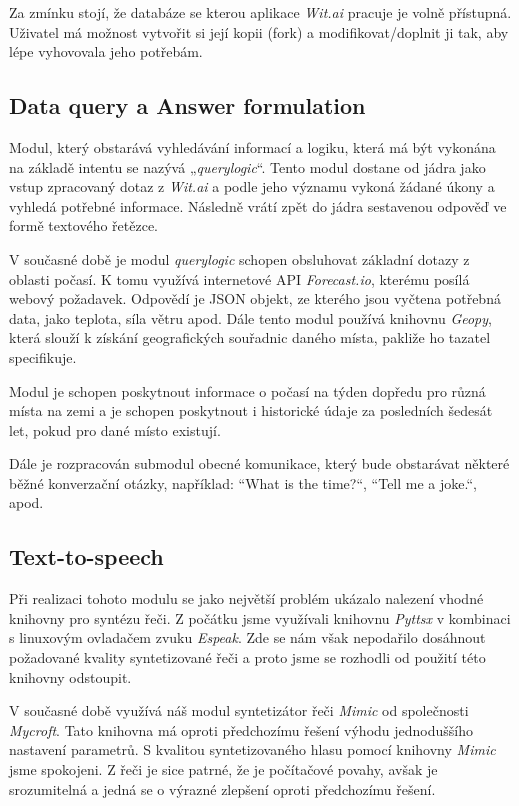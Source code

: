 \documentclass[12pt,a4paper]{article}
\begin{document}
Za zmínku stojí, že databáze se kterou aplikace \textit{Wit.ai} pracuje je volně přístupná. Uživatel má možnost vytvořit si její kopii (fork) a modifikovat/doplnit ji tak, aby lépe vyhovovala jeho potřebám.

\subsection{Data query a Answer formulation}
Modul, který obstarává vyhledávání informací a logiku, která má být vykonána na základě intentu se nazývá „\textit{querylogic}“. Tento modul dostane od jádra jako vstup zpracovaný dotaz z \textit{Wit.ai} a podle jeho významu vykoná žádané úkony a vyhledá potřebné informace. Následně vrátí zpět do jádra sestavenou odpověď ve formě textového řetězce.

V současné době je modul \textit{querylogic} schopen obsluhovat základní dotazy z oblasti počasí. K tomu využívá internetové API \textit{Forecast.io}, kterému posílá webový požadavek. Odpovědí je JSON objekt, ze kterého jsou vyčtena potřebná data, jako teplota, síla větru apod.
Dále tento modul používá knihovnu \textit{Geopy}, která slouží k získání geografických souřadnic daného místa, pakliže ho tazatel specifikuje. 

Modul je schopen poskytnout informace o počasí na týden dopředu pro různá místa na zemi a je schopen poskytnout i historické údaje za posledních šedesát let, pokud pro dané místo existují.

Dále je rozpracován submodul obecné komunikace, který bude obstarávat některé běžné konverzační otázky, například:  “What is the time?“, “Tell me a joke.“, apod.

\subsection{Text-to-speech}
Při realizaci tohoto modulu se jako největší problém ukázalo nalezení vhodné knihovny pro syntézu řeči. Z počátku jsme využívali knihovnu \textit{Pyttsx} v kombinaci s linuxovým ovladačem zvuku \textit{Espeak}. Zde se nám však nepodařilo dosáhnout požadované kvality syntetizované řeči a proto jsme se rozhodli od použití této knihovny odstoupit.

V současné době využívá náš modul syntetizátor řeči \textit{Mimic} od společnosti \textit{Mycroft}. 
Tato knihovna má oproti předchozímu řešení výhodu jednoduššího nastavení parametrů. S kvalitou syntetizovaného hlasu pomocí knihovny \textit{Mimic} jsme spokojeni. Z řeči je sice patrné, že je počítačové povahy, avšak je srozumitelná a jedná se o výrazné zlepšení oproti předchozímu řešení.
\end{document}
